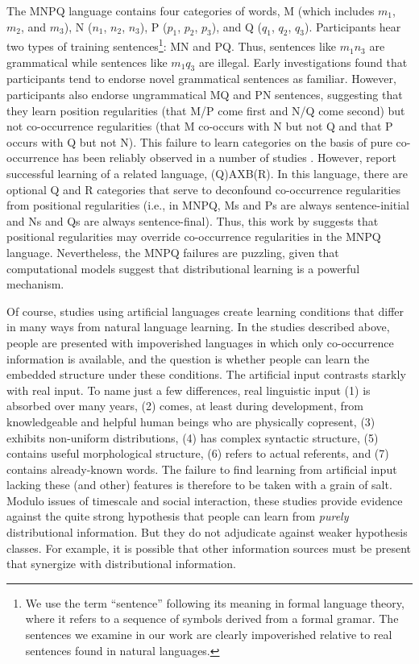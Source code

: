 \documentclass[man,floatsintext]{apa6}
\begin{document}
The MNPQ language contains four categories of words, M (which includes $m_1$, $m_2$, and $m_3$), N ($n_1$, $n_2$, $n_3$), P ($p_1$, $p_2$, $p_3$), and Q ($q_1$, $q_2$, $q_3$). Participants hear two types of training sentences\footnote{ We use the term ``sentence'' following its meaning in formal language theory, where it refers to a sequence of symbols derived from a formal gramar. The sentences we examine in our work are clearly impoverished relative to real sentences found in natural languages.}: MN and PQ. Thus, sentences like $m_1 n_3$ are grammatical while sentences like $m_1 q_3$ are illegal. Early investigations \citep{braine1966, smith1966} found that participants tend to endorse novel grammatical sentences as familiar. However, participants also endorse ungrammatical MQ and PN sentences, suggesting that they learn position regularities (that M/P come first and N/Q come second) but not co-occurrence regularities (that M co-occurs with N but not Q and that P occurs with Q but not N). This failure to learn categories on the basis of pure co-occurrence has been reliably observed in a number of studies \citep{braine1987, brooks1993, frigo1998, kempe2001, gerken2005, lany2010, frank2011}. However, \citet[Experiment 5]{reeder2009} report successful learning of a related language, (Q)AXB(R). In this language, there are optional Q and R categories that serve to deconfound co-occurrence regularities from positional regularities (i.e., in MNPQ, Ms and Ps are always sentence-initial and Ns and Qs are always sentence-final). Thus, this work by \citeauthor{reeder2009} suggests that positional regularities may override co-occurrence regularities in the MNPQ language. Nevertheless, the MNPQ failures are puzzling, given that computational models suggest that distributional learning is a powerful mechanism.

Of course, studies using artificial languages create learning conditions that differ in many ways from natural language learning.
In the studies described above, people are presented with impoverished languages in which only co-occurrence information is available, and the question is whether people can learn the embedded structure under these conditions.
The artificial input contrasts starkly with real input.
To name just a few differences, real linguistic input (1) is absorbed over many years, (2) comes, at least during development, from knowledgeable and helpful human beings who are physically copresent, (3) exhibits non-uniform distributions, (4) has complex syntactic structure, (5) contains useful morphological structure, (6) refers to actual referents, and (7) contains already-known words.
The failure to find learning from artificial input lacking these (and other) features is therefore to be taken with a grain of salt.
Modulo issues of timescale and social interaction, these studies provide evidence against the quite strong hypothesis that people can learn from \emph{purely} distributional information.
But they do not adjudicate against weaker hypothesis classes.
For example, it is possible that other information sources must be present that synergize with distributional information.
\end{document}
